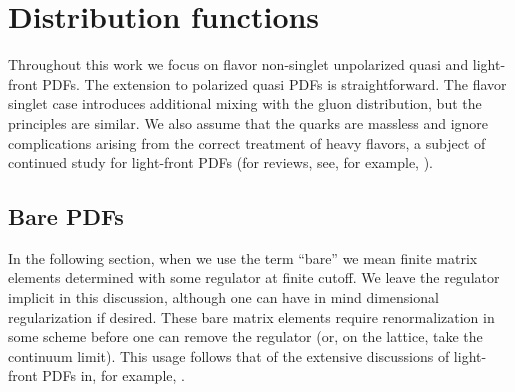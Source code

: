 \section{\label{sec:defs}Distribution functions}


Throughout this work we focus on flavor non-singlet unpolarized quasi and 
light-front PDFs. The extension to polarized quasi PDFs is straightforward. The 
flavor singlet case introduces additional mixing with the gluon distribution, 
but the principles are similar. We also assume that the
quarks are massless and ignore complications arising from the correct 
treatment of heavy flavors, a subject of continued study for light-front 
PDFs (for reviews, see, for example, 
\cite{Thorne:2008xf,Olness:2008px,Binoth:2010nha}).

\subsection{Bare PDFs}

In the following section, when we use the term ``bare'' we mean finite
matrix elements determined with some regulator at finite cutoff. We leave the 
regulator implicit in this discussion, although one can have in mind 
dimensional regularization if desired. These bare matrix elements require 
renormalization in some scheme before one can remove the regulator (or, on the 
lattice, take the continuum limit). This usage follows that of the extensive 
discussions of light-front PDFs in, for example, 
\cite{Collins:1981uw,Collins:2011zzd}.

